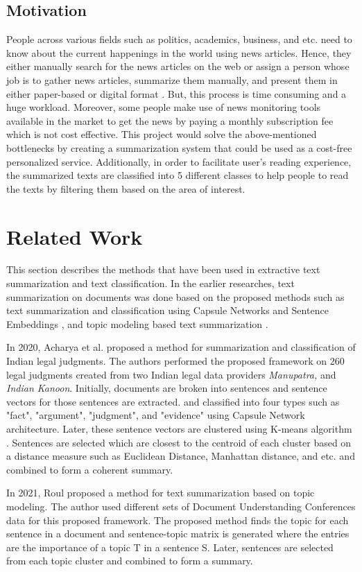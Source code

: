 \documentclass[a4paper,4pt]{article}
\begin{document}
\subsection{Motivation}
People across various fields such as politics, academics, business, and etc. need to know about the current happenings in the world 
using news articles. Hence, they either manually search for the news articles on the web or assign a person whose job 
is to gather news articles, summarize them manually, and present them in either paper-based or digital 
format \cite{businessPersonnel}. But, this process is time consuming and a huge workload. Moreover, some people make use of 
news monitoring tools available in the market to get the news by paying a monthly subscription fee \cite{newsmonitoring} which is not cost effective.
This project would solve the above-mentioned bottlenecks by creating a summarization system that could be used as a cost-free personalized service.
Additionally, in order to facilitate user's reading experience, the summarized texts are classified into 5 different classes to 
help people to read the texts by filtering them based on the area of interest.

\section{Related Work}
This section describes the methods that have been used in extractive text summarization and text classification. In the earlier researches, text
summarization on documents was done based on the proposed methods such as text summarization and classification using Capsule 
Networks and Sentence Embeddings \cite{LegoNet}, and 
topic modeling based text summarization \cite{topicmodelingSummarization}. \\
\par 
In 2020, Acharya et al. \cite{LegoNet} proposed a method for summarization and classification of Indian legal judgments.
The authors performed the proposed framework on 260 legal judgments created from two Indian legal data providers \textit{Manupatra,}
and \textit{Indian Kanoon}. Initially, documents are broken into sentences and sentence vectors for those sentences are extracted.
and classified into four types such as "fact", "argument", "judgment",
and "evidence" using Capsule Network architecture. Later, these sentence vectors are clustered using K-means algorithm \cite{macqueen1967some}. Sentences 
are selected which are closest to the centroid of each cluster based on a distance measure such as Euclidean Distance, 
Manhattan distance, and etc. and combined to form a coherent summary. \\
\par
In 2021, Roul \cite{topicmodelingSummarization} proposed a method for text summarization based on topic modeling. The 
author used different sets of Document Understanding Conferences data for this proposed framework. The proposed method 
finds the topic for each sentence in a document and sentence-topic matrix is generated where the entries are the importance 
of a topic T in a sentence S. Later, sentences are selected from each topic cluster and combined to form a summary.
\end{document}
